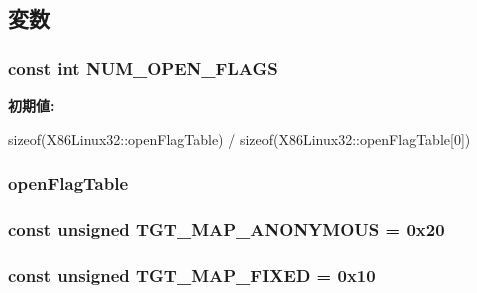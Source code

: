 \subsection{変数}
\hypertarget{classX86Linux32_ad85b9918c8f2c8739537a002dc1dc526}{
\subsubsection[{NUM\_\-OPEN\_\-FLAGS}]{\setlength{\rightskip}{0pt plus 5cm}const int {\bf NUM\_\-OPEN\_\-FLAGS}}}
\label{classX86Linux32_ad85b9918c8f2c8739537a002dc1dc526}
{\bfseries 初期値:}
\begin{DoxyCode}

        sizeof(X86Linux32::openFlagTable) /
        sizeof(X86Linux32::openFlagTable[0])
\end{DoxyCode}
\hypertarget{classX86Linux32_ab1db5a531609b99b262cc849ea24765a}{
\subsubsection[{openFlagTable}]{ {\bf openFlagTable}}}
\label{classX86Linux32_ab1db5a531609b99b262cc849ea24765a}
\hypertarget{classX86Linux32_a0bbc267200567dd98250b99b6085a499}{
\subsubsection[{TGT\_\-MAP\_\-ANONYMOUS}]{\setlength{\rightskip}{0pt plus 5cm}const unsigned {\bf TGT\_\-MAP\_\-ANONYMOUS} = 0x20}}
\label{classX86Linux32_a0bbc267200567dd98250b99b6085a499}
\hypertarget{classX86Linux32_a0124e421d7846143bca15728b7a53e14}{
\subsubsection[{TGT\_\-MAP\_\-FIXED}]{\setlength{\rightskip}{0pt plus 5cm}const unsigned {\bf TGT\_\-MAP\_\-FIXED} = 0x10}}
